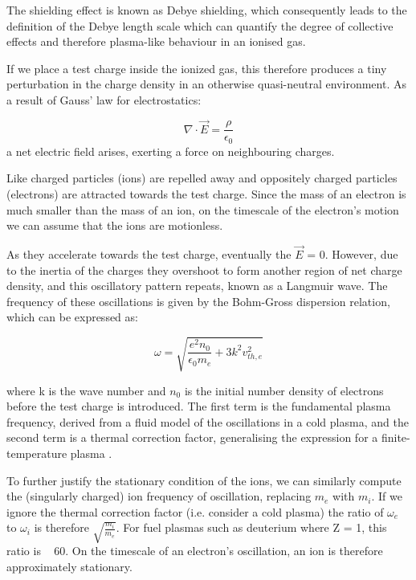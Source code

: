 \documentclass[a4paper,titlepage]{article}
\let\cite\parencite
\begin{document}
\begin{flushleft}
The shielding effect is known as Debye shielding, which consequently leads to the definition of the Debye length scale which can quantify the degree of collective effects and therefore plasma-like behaviour in an ionised gas. 

If we place a test charge inside the ionized gas, this therefore produces a tiny perturbation in the charge density in an otherwise quasi-neutral environment. As a result of Gauss' law for electrostatics:

\begin{equation}
\nabla \cdot \vec{E} = \frac{\rho}{\epsilon_0}
\end{equation}
a net electric field arises, exerting a force on neighbouring charges.

Like charged particles (ions) are repelled away and oppositely charged particles (electrons) are attracted towards the test charge. Since the mass of an electron is much smaller than the mass of an ion, on the timescale of the electron's motion we can assume that the ions are motionless.

As they accelerate towards the test charge, eventually the $\vec{E}$ = 0. However, due to the inertia of the charges they overshoot to form another region of net charge density, and this oscillatory pattern repeats, known as a Langmuir wave. The frequency of these oscillations is given by the Bohm-Gross dispersion relation, which can be expressed as:

\begin{equation}
    \omega=\sqrt{\frac{e^2n_{0}}{\epsilon_0 m_e} + 3k^2 v_{th, e}^2}
\end{equation}

where k is the wave number and $n_0$ is the initial number density of electrons before the test charge is introduced. The first term is the fundamental plasma frequency, derived from a fluid model of the oscillations in a cold plasma, and the second term is a thermal correction factor, generalising the expression for a finite-temperature plasma \cite{mcgreivy_2024_general}. \newline

To further justify the stationary condition of the ions, we can similarly compute the (singularly charged) ion frequency of oscillation, replacing $m_e$ with $m_i$. If we ignore the thermal correction factor (i.e. consider a cold plasma) the ratio of $\omega_e$ to $\omega_i$ is therefore $\sqrt{\frac{m_i}{m_e}}$. For fuel plasmas such as deuterium where Z = 1, this ratio is ~ 60. On the timescale of an electron's oscillation, an ion is therefore approximately stationary. 


\end{flushleft}
\end{document}
